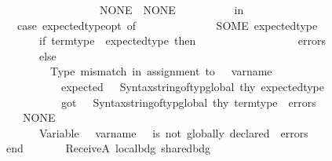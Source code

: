 \begin{isabellebody}
\ \ \ \ \ \ \ \ \ \ \ \ \ \ \ \ \ \ \ \ \ \ \ \ \ \ {\isacharbar}{\kern0pt}\ NONE\ {\isacharequal}{\kern0pt}{\isachargreater}{\kern0pt}\ NONE\isanewline
\ \ \ \ \ \ \ \ \ \ in\isanewline
\ \ \ \ \ \ \ \ \ \ \ \ case\ expected{\isacharunderscore}{\kern0pt}type{\isacharunderscore}{\kern0pt}opt\ of\isanewline
\ \ \ \ \ \ \ \ \ \ \ \ \ \ SOME\ expected{\isacharunderscore}{\kern0pt}type\ {\isacharequal}{\kern0pt}{\isachargreater}{\kern0pt}\isanewline
\ \ \ \ \ \ \ \ \ \ \ \ \ \ \ \ if\ term{\isacharunderscore}{\kern0pt}type\ {\isacharequal}{\kern0pt}\ expected{\isacharunderscore}{\kern0pt}type\ then\isanewline
\ \ \ \ \ \ \ \ \ \ \ \ \ \ \ \ \ \ errors\isanewline
\ \ \ \ \ \ \ \ \ \ \ \ \ \ \ \ else\isanewline
\ \ \ \ \ \ \ \ \ \ \ \ \ \ \ \ \ \ {\isacharparenleft}{\kern0pt}{\isachardoublequote}{\kern0pt}Type\ mismatch\ in\ assignment\ to\ {\isachardoublequote}{\kern0pt}\ {\isacharcircum}{\kern0pt}\ var{\isacharunderscore}{\kern0pt}name\ {\isacharcircum}{\kern0pt}\isanewline
\ \ \ \ \ \ \ \ \ \ \ \ \ \ \ \ \ \ \ {\isachardoublequote}{\kern0pt}{\isacharcolon}{\kern0pt}\ expected\ {\isachardoublequote}{\kern0pt}\ {\isacharcircum}{\kern0pt}\ Syntax{\isachardot}{\kern0pt}string{\isacharunderscore}{\kern0pt}of{\isacharunderscore}{\kern0pt}typ{\isacharunderscore}{\kern0pt}global\ thy\ expected{\isacharunderscore}{\kern0pt}type\ {\isacharcircum}{\kern0pt}\isanewline
\ \ \ \ \ \ \ \ \ \ \ \ \ \ \ \ \ \ \ {\isachardoublequote}{\kern0pt}{\isacharcomma}{\kern0pt}\ got\ {\isachardoublequote}{\kern0pt}\ {\isacharcircum}{\kern0pt}\ Syntax{\isachardot}{\kern0pt}string{\isacharunderscore}{\kern0pt}of{\isacharunderscore}{\kern0pt}typ{\isacharunderscore}{\kern0pt}global\ thy\ term{\isacharunderscore}{\kern0pt}type{\isacharparenright}{\kern0pt}\ {\isacharcolon}{\kern0pt}{\isacharcolon}{\kern0pt}\ errors\isanewline
\ \ \ \ \ \ \ \ \ \ \ \ {\isacharbar}{\kern0pt}\ NONE\ {\isacharequal}{\kern0pt}{\isachargreater}{\kern0pt}\isanewline
\ \ \ \ \ \ \ \ \ \ \ \ \ \ \ \ {\isacharparenleft}{\kern0pt}{\isachardoublequote}{\kern0pt}Variable\ {\isachardoublequote}{\kern0pt}\ {\isacharcircum}{\kern0pt}\ var{\isacharunderscore}{\kern0pt}name\ {\isacharcircum}{\kern0pt}\ {\isachardoublequote}{\kern0pt}\ is\ not\ globally\ declared{\isachardoublequote}{\kern0pt}{\isacharparenright}{\kern0pt}\ {\isacharcolon}{\kern0pt}{\isacharcolon}{\kern0pt}\ errors\isanewline
\ \ \ \ \ \ \ \ \ \ end\isanewline
\isanewline
\ \ \ \ \ \ {\isacharbar}{\kern0pt}\ ReceiveA\ {\isacharparenleft}{\kern0pt}local{\isacharunderscore}{\kern0pt}bdg{\isacharcomma}{\kern0pt}\ shared{\isacharunderscore}{\kern0pt}bdg{\isacharparenright}{\kern0pt}\ {\isacharequal}{\kern0pt}{\isachargreater}{\kern0pt}\isanewline

\end{isabellebody}
